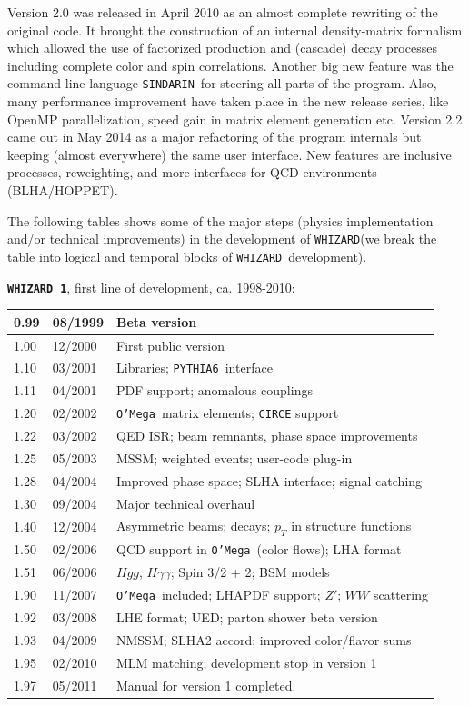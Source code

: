 \documentclass[12pt]{book}
\newcommand{\ttt}[1]{\texttt{#1}}
\newcommand{\whizard}{\ttt{WHIZARD}}
\newcommand{\oMega}{\ttt{O'Mega}}
\newcommand{\pythiasix}{\ttt{PYTHIA6}}
\newcommand{\sindarin}{\ttt{SINDARIN}}
\begin{document}
Version 2.0 was released in April 2010 as an almost complete rewriting
of the original code. It brought the construction of an internal
density-matrix formalism which allowed the use of factorized
production and (cascade) decay processes including complete color and
spin correlations. Another big new feature was the command-line
language \sindarin\ for steering all parts of the program. Also, many
performance improvement have taken place in the new release series,
like OpenMP parallelization, speed gain in matrix element generation
etc. Version 2.2 came out in May 2014 as a major refactoring of the
program internals but keeping (almost everywhere) the same user
interface. New features are inclusive processes, reweighting, and more
interfaces for QCD environments (BLHA/HOPPET).

The following tables shows some of the major steps (physics
implementation and/or technical improvements) in the development
of \whizard (we break the table into logical and temporal blocks of
\whizard\ development).

\newpage

{
{\bf \whizard\ \texttt{1}}, first line of development, ca. 1998-2010:
\nopagebreak[4]
\begin{center}
\begin{tabular}{|l|l|l|}\hline
  0.99 & 08/1999 & Beta version \\\hline
  1.00 & 12/2000 & First public version \\\hline
  1.10 & 03/2001 & Libraries; \pythiasix\ interface \\
  1.11 & 04/2001 & PDF support; anomalous couplings \\ \hline
  1.20 & 02/2002 & \oMega\ matrix elements; \ttt{CIRCE} support\\
  1.22 & 03/2002 & QED ISR; beam remnants, phase space improvements \\
  1.25 & 05/2003 & MSSM; weighted events; user-code plug-in \\
  1.28 & 04/2004 & Improved phase space; SLHA interface; signal catching
  \\\hline
  1.30 & 09/2004 & Major technical overhaul \\\hline
  1.40 & 12/2004 & Asymmetric beams; decays; $p_T$ in structure
  functions \\\hline
  1.50 & 02/2006 & QCD support in \oMega\ (color flows); LHA format \\
  1.51 & 06/2006 & $Hgg$, $H\gamma\gamma$; Spin 3/2 + 2; BSM models
  \\\hline
  1.90 & 11/2007 & \oMega\ included; LHAPDF support; $Z'$; $WW$ scattering \\
  1.92 & 03/2008 & LHE format; UED; parton shower beta version \\
  1.93 & 04/2009 & NMSSM; SLHA2 accord; improved color/flavor sums \\
  1.95 & 02/2010 & MLM matching; development stop in version 1
  \\
  1.97 & 05/2011 & Manual for version 1 completed. \\\hline\hline
\end{tabular}
\end{center}
}
\end{document}

